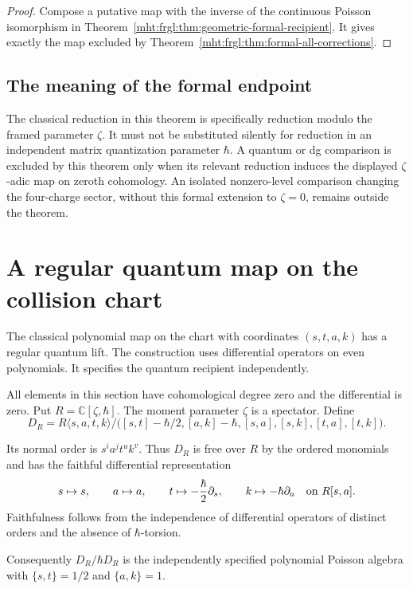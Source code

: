 \begin{proof}
Compose a putative map with the inverse of the continuous
Poisson isomorphism in
Theorem~\ref{mht:frgl:thm:geometric-formal-recipient}. It gives exactly
the map excluded by Theorem~\ref{mht:frgl:thm:formal-all-corrections}.
\end{proof}

\subsection{The meaning of the formal endpoint}

The classical reduction in this theorem is specifically reduction
modulo the framed parameter $\zeta$. It must not be substituted
silently for reduction in an independent matrix quantization
parameter $\hbar$. A quantum or dg comparison is excluded by this
theorem only when its relevant reduction induces the displayed
$\zeta$-adic map on zeroth cohomology. An isolated nonzero-level
comparison changing the four-charge sector, without this formal
extension to $\zeta=0$, remains outside the theorem.
\section{A regular quantum map on the collision chart}
\label{mht:frgl:sec:regular-quantum-chart}

The classical polynomial map on the chart with coordinates
$(s,t,a,k)$ has a regular quantum lift.  The construction uses
differential operators on even polynomials.  It specifies the
quantum recipient independently.

All elements in this section have cohomological degree zero and
the differential is zero.  Put $R=\mathbb C[\zeta,\hbar]$. The
moment parameter $\zeta$ is a spectator.  Define
\[
 D_R=R\langle s,a,t,k\rangle/
 \bigl([s,t]-\hbar/2,[a,k]-\hbar,
       [s,a],[s,k],[t,a],[t,k]\bigr).
\]

Its normal order is $s^i a^j t^u k^v$.  Thus $D_R$ is free over
$R$ by the ordered monomials and has the faithful differential
representation
\[
 s\mapsto s,\qquad a\mapsto a,\qquad
 t\mapsto-\frac{\hbar}{2}\partial_s,
 \qquad k\mapsto-\hbar\partial_a
 \quad\hbox{on }R[s,a].
\]
Faithfulness follows from the independence of differential
operators of distinct orders and the absence of $\hbar$-torsion.

Consequently $D_R/\hbar D_R$ is the independently specified
polynomial Poisson algebra with
$\{s,t\}=1/2$ and $\{a,k\}=1$.

